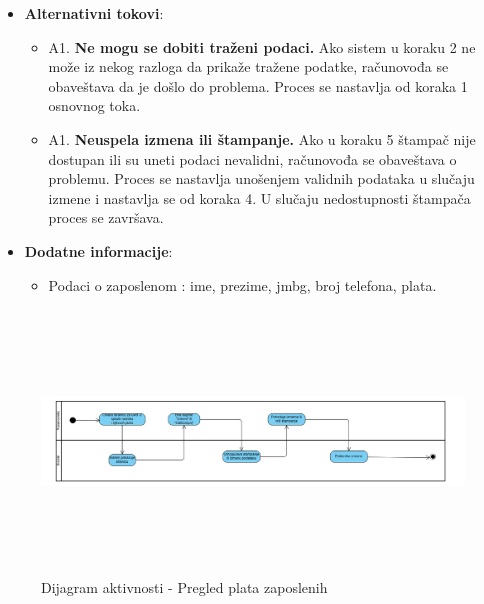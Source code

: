 \begin{itemize}
  \item \textbf{Alternativni tokovi}:
      \begin{itemize}
        \item A1. \textbf{Ne mogu se dobiti traženi podaci.}
        Ako sistem u koraku 2 ne može iz nekog razloga da prikaže tražene podatke, računovođa se obaveštava da je došlo do problema.
        Proces se nastavlja od koraka 1 osnovnog toka.
        \item A1. \textbf{Neuspela izmena ili štampanje.}
        Ako u koraku 5 štampač nije dostupan ili su uneti podaci nevalidni, računovođa se obaveštava o problemu. Proces se nastavlja unošenjem
        validnih podataka u slučaju izmene i nastavlja se od koraka 4. U slučaju nedostupnosti štampača proces se završava.
      \end{itemize}

      
  \item \textbf{Dodatne informacije}:
      \begin{itemize}
        \item Podaci o zaposlenom : ime, prezime, jmbg, broj telefona, plata.
      \end{itemize}
\end{itemize}

\begin{figure}[H]
  \begin{center}
      \includegraphics[width=140mm, height=70mm]{Diagrams/pregled_zaposlenih.png}
  \end{center}
  \caption {Dijagram aktivnosti - Pregled plata zaposlenih}
  \label{activity_pregled_zaposlenih}

\end{figure}
